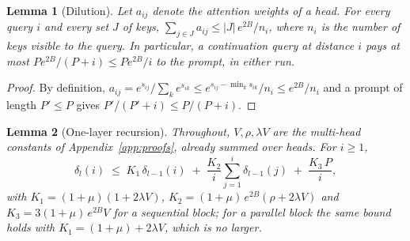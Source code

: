 \documentclass[11pt]{article}
\newtheorem{lemma}{Lemma}
\theoremstyle{definition}
\theoremstyle{remark}
\begin{document}
\begin{lemma}[Dilution]\label{lem:dilution}
Let $a_{ij}$ denote the attention weights of a head. For every query $i$ and every set $J$ of keys, $\sum_{j\in J}a_{ij}\le|J|\,e^{2B}/n_i$, where $n_i$ is the number of keys visible to the query. In particular, a continuation query at distance $i$ pays at most $Pe^{2B}/(P+i)\le Pe^{2B}/i$ to the prompt, in either run.
\end{lemma}
\begin{proof}
By definition, $a_{ij}=e^{s_{ij}}/\sum_k e^{s_{ik}}\le e^{s_{ij}-\min_ks_{ik}}/n_i\le e^{2B}/n_i$ and a prompt of length $P'\le P$ gives $P'/(P'+i)\le P/(P+i)$.
\end{proof}

\begin{lemma}[One-layer recursion]\label{lem:recursion}
Throughout, $V,\rho,\lambda V$ are the multi-head constants of Appendix~\ref{app:proofs}, already summed over heads. For $i\ge1$,
\begin{equation}\label{eq:recursion}
  \delta_l(i)\;\le\;K_1\,\delta_{l-1}(i)\;+\;\frac{K_2}{i}\sum_{j=1}^{i}\delta_{l-1}(j)\;+\;\frac{K_3\,P}{i},
\end{equation}
with $K_1=(1+\mu)(1+2\lambda V)$, $K_2=(1+\mu)\,e^{2B}(\rho+2\lambda V)$ and $K_3=3(1+\mu)\,e^{2B}V$ for a sequential block; for a parallel block the same bound holds with $K_1=(1+\mu)+2\lambda V$, which is no larger.
\end{lemma}
\end{document}
